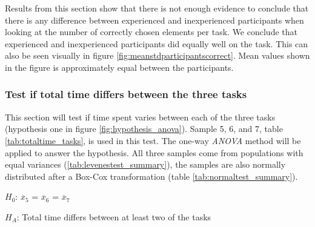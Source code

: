 Results from this section show that there is not enough evidence to conclude that there is any difference between experienced and inexperienced participants when looking at the number of correctly chosen elements per task. We conclude that experienced and inexperienced participants did equally well on the task. This can also be seen visually in figure \ref{fig:meanstdparticipantscorrect}. Mean values shown in the figure is approximately equal between the participants. 

\subsubsection[Sample 5, 6 and 7]{Test if total time differs between the three tasks}\label{sec:anova_result} %
This section will test if time spent varies between each of the three tasks (hypothesis one in figure \ref{fig:hypothesis_anova}). Sample 5, 6, and 7, table \ref{tab:totaltime_tasks}, is used in this test. The one-way \textit{ANOVA} method will be applied to answer the hypothesis. All three samples come from populations with equal variances (\ref{tab:levenestest_summary}), the samples are also normally distributed after a Box-Cox transformation (table \ref{tab:normaltest_summary}).\\

\centerline{$H_{0}$: $\overline{x}_5$ = $\overline{x}_6$ = $\overline{x}_7$}
\centerline{$H_{A}$: Total time differs between at least two of the tasks}

